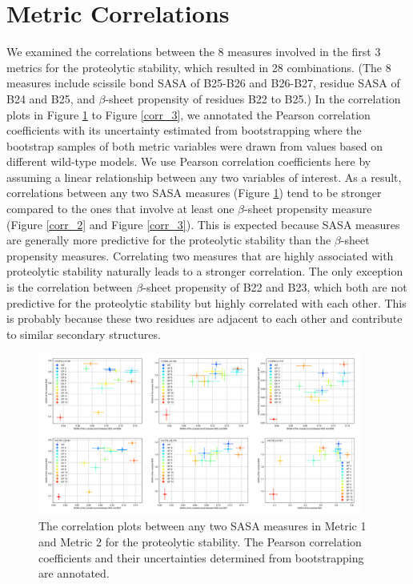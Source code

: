 \documentclass[sn-vancouver]{sn-jnl}
\begin{document}
\section{Metric Correlations}
We examined the correlations between the 8 measures involved in the first 3 metrics for the proteolytic stability, which resulted in 28 combinations. (The 8 measures include scissile bond SASA of B25-B26 and B26-B27, residue SASA of B24 and B25, and $\beta$-sheet propensity of residues B22 to B25.) In the correlation plots in Figure \ref{corr_1} to Figure \ref{corr_3}, we annotated the Pearson correlation coefficients with its uncertainty estimated from bootstrapping where the bootstrap samples of both metric variables were drawn from values based on different wild-type models. We use Pearson correlation coefficients here by assuming a linear relationship between any two variables of interest. As a result, correlations between any two SASA measures (Figure \ref{corr_1}) tend to be stronger compared to the ones that involve at least one $\beta$-sheet propensity measure (Figure \ref{corr_2} and Figure \ref{corr_3}). This is expected because SASA measures are generally more predictive for the proteolytic stability than the $\beta$-sheet propensity measures. Correlating two measures that are highly associated with proteolytic stability naturally leads to a stronger correlation. The only exception is the correlation between $\beta$-sheet propensity of B22 and B23, which both are not predictive for the proteolytic stability but highly correlated with each other. This is probably because these two residues are adjacent to each other and contribute to similar secondary structures. 

\begin{figure}[H]
\centering
\includegraphics[width=0.95\textwidth]{Figures/Fig_SASA_metrics_correlation.png}
\caption{The correlation plots between any two SASA measures in Metric 1 and Metric 2 for the proteolytic stability. The Pearson correlation coefficients and their uncertainties determined from bootstrapping are annotated.}
\label{corr_1}
\end{figure}
\end{document}
